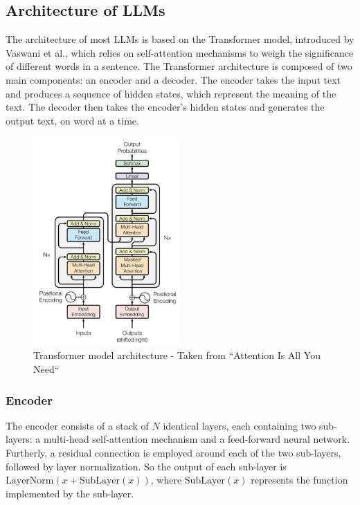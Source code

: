         \subsection{Architecture of LLMs}
        The architecture of most LLMs is based on the Transformer model, introduced by Vaswani et al.\cite{vaswani2023attention}, which relies on self-attention mechanisms to weigh the significance of different words in a sentence. The Transformer architecture is composed of two main components: an encoder and a decoder. The encoder takes the input text and produces a sequence of hidden states, which represent the meaning of the text. The decoder then takes the encoder's hidden states and generates the output text, on word at a time.
            \begin{figure}[h!]
                \centering
                \includegraphics[width=0.5\textwidth]{figs/transform_model.png}
                \caption{Transformer model architecture - Taken from “Attention Is All You Need“}
            \end{figure}
            \subsubsection{Encoder}
            The encoder consists of a stack of \(N\) identical layers, each containing two sub-layers: a multi-head self-attention mechanism and a feed-forward neural network. Furtherly, a residual connection is employed around each of the two sub-layers, followed by layer normalization. So the output of each sub-layer is \(\text{LayerNorm}(x + \text{SubLayer} (x))\), where \(\text{SubLayer}(x)\) represents the function implemented by the sub-layer.
            
